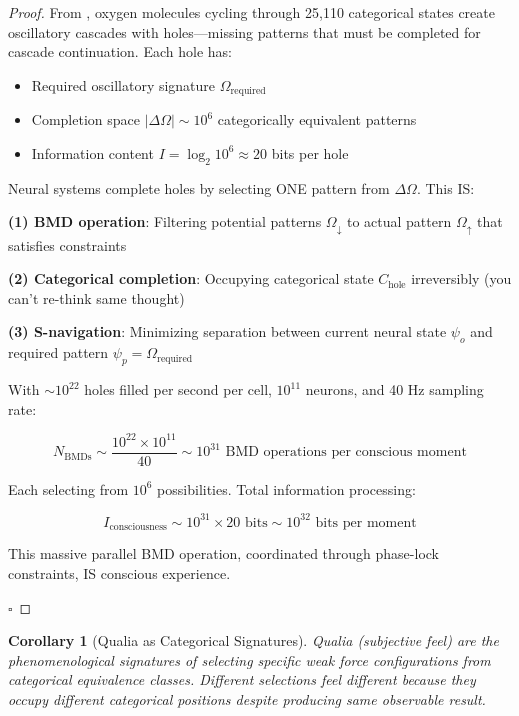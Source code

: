 \documentclass[12pt,a4paper]{article}
\newtheorem{corollary}[theorem]{Corollary}
\begin{document}
\begin{proof}
From \cite{sachikonye2024consciousness}, oxygen molecules cycling through 25,110 categorical states create oscillatory cascades with holes—missing patterns that must be completed for cascade continuation. Each hole has:

\begin{itemize}
\item Required oscillatory signature $\Omega_{\text{required}}$
\item Completion space $|\Delta\Omega| \sim 10^6$ categorically equivalent patterns
\item Information content $I = \log_2 10^6 \approx 20$ bits per hole
\end{itemize}

Neural systems complete holes by selecting ONE pattern from $\Delta\Omega$. This IS:

\textbf{(1) BMD operation}: Filtering potential patterns $\Omega_{\downarrow}$ to actual pattern $\Omega_{\uparrow}$ that satisfies constraints

\textbf{(2) Categorical completion}: Occupying categorical state $C_{\text{hole}}$ irreversibly (you can't re-think same thought)

\textbf{(3) S-navigation}: Minimizing separation between current neural state $\psi_o$ and required pattern $\psi_p = \Omega_{\text{required}}$

With $\sim 10^{22}$ holes filled per second per cell, $10^{11}$ neurons, and 40 Hz sampling rate:

\begin{equation}
N_{\text{BMDs}} \sim \frac{10^{22} \times 10^{11}}{40} \sim 10^{31} \text{ BMD operations per conscious moment}
\end{equation}

Each selecting from $10^6$ possibilities. Total information processing:

\begin{equation}
I_{\text{consciousness}} \sim 10^{31} \times 20 \text{ bits} \sim 10^{32} \text{ bits per moment}
\end{equation}

This massive parallel BMD operation, coordinated through phase-lock constraints, IS conscious experience.

$\square$
\end{proof}

\begin{corollary}[Qualia as Categorical Signatures]
Qualia (subjective feel) are the phenomenological signatures of selecting specific weak force configurations from categorical equivalence classes. Different selections feel different because they occupy different categorical positions despite producing same observable result.
\end{corollary}
\end{document}
